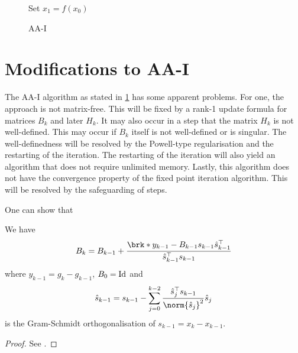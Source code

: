 \begin{figure}
\begin{algorithm}[H]
\caption{AA-I}
\label{alg:aa1}

\BlankLine
Set $x_1=f(x_0)$

\end{algorithm}
\end{figure}


\section{Modifications to AA-I}

The AA-I algorithm as stated in \ref{alg:aa1} has some apparent problems. For one, the approach is not matrix-free. This will be fixed by a rank-1 update formula for matrices $B_k$ and later $H_k$. It may also occur in a step that the matrix $H_k$ is not well-defined. This may occur if $B_k$ itself is not well-defined or is singular. The well-definedness will be resolved by the Powell-type regularisation and the restarting of the iteration. The restarting of the iteration will also yield an algorithm that does not require unlimited memory. Lastly, this algorithm does not have the convergence property of the fixed point iteration algorithm. This will be resolved by the safeguarding of steps.
	
	
One can show that
\begin{proposition}
	We have
	\begin{align*}
		B_{k} = B_{k-1}+\frac{\brk*{y_{k-1}-B_{k-1}s_{k-1}}\hs_{k-1}^\top}{\hs_{k-1}^\top s_{k-1}}
	\end{align*}
	where $y_{k-1} = g_{k}-g_{k-1}$, $B_0=\operatorname{Id}$ and
	\begin{align*}
		\hs_{k-1} = s_{k-1}-\sum_{j=0}^{k-2}\frac{\hs_j^\top s_{k-1}}{\norm{\hs_j}^2}\hs_j
	\end{align*}
	is the Gram-Schmidt orthogonalisation of $s_{k-1}=x_{k}-x_{k-1}$.
\end{proposition}
\begin{proof}
	See \cite{ZhaAA}.
\end{proof}



